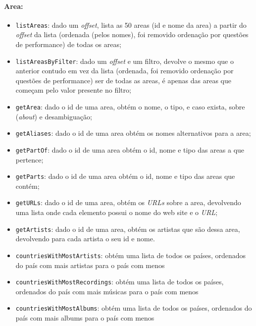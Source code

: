 \documentclass{article}
\begin{document}
\paragraph{\textbf{Area:}}
    \begin{itemize}
        \item \texttt{listAreas}: dado um \textit{offset}, lista as 50 areas (id e nome da area) a partir do \textit{offset} da lista (ordenada (pelos nomes), foi removido ordenação por questões de performance) de todas os areas;
        \item \texttt{listAreasByFilter}: dado um \textit{offset} e um filtro, devolve o mesmo que o anterior contudo em vez da lista (ordenada, foi removido ordenação por questões de performance) ser de todas as areas, é apenas das areas que começam pelo valor presente no filtro;
        \item \texttt{getArea}: dado o id de uma area, obtém o nome, o tipo, e caso exista, sobre (\textit{about}) e desambiguação;
        \item \texttt{getAliases}: dado o id de uma area obtém os nomes alternativos para a area;
        \item \texttt{getPartOf}: dado o id de uma area obtém o id, nome e tipo das areas a que pertence;
        \item \texttt{getParts}: dado o id de uma area obtém o id, nome e tipo das areas que contém;
        \item \texttt{getURLs}: dado o id de uma area, obtém os \textit{URLs} sobre a area, devolvendo uma lista onde cada elemento possui o nome do web site e o \textit{URL};
        \item \texttt{getArtists}: dado o id de uma area, obtém os artistas que são dessa area, devolvendo para cada artista o seu id e nome.
        \item \texttt{countriesWithMostArtists}: obtém uma lista de todos os países, ordenados do país com mais artistas para o país com menos
        \item \texttt{countriesWithMostRecordings}: obtém uma lista de todos os países, ordenados do país com mais músicas para o país com menos
        \item \texttt{countriesWithMostAlbums}: obtém uma lista de todos os países, ordenados do país com mais albums para o país com menos
    \end{itemize}
\end{document}
